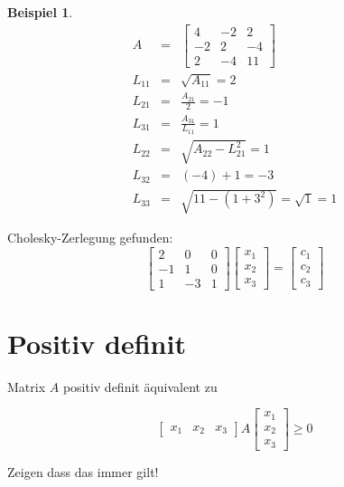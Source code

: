 \documentclass[11pt]{article} %
\theoremstyle{definition}
\newtheorem*{beispiel}{Beispiel}
\begin{document}
\begin{beispiel}
\begin{eqnarray*}
A &=& \begin{bmatrix}
4 & -2 & 2 \\ -2 & 2 & -4 \\ 2 & -4 & 11
\end{bmatrix} \\
L_{11} &=& \sqrt{A_{11}} = 2 \\
L_{21} &=& \frac{A_{21}}{2} = -1 \\
L_{31} &=& \frac{A_{31}}{L_{11}} = 1 \\
L_{22} &=& \sqrt{A_{22} - L_{21}^2} = 1 \\
L_{32} &=& (-4) + 1 = -3 \\
L_{33} &=& \sqrt{11 - (1+3^2)} = \sqrt{1} = 1
\end{eqnarray*}

Cholesky-Zerlegung gefunden:
\[
\begin{bmatrix}
2 & 0 & 0 \\
-1 & 1 & 0 \\
1 & -3 & 1
\end{bmatrix}
\begin{bmatrix}
x_1 \\ x_2 \\ x_3
\end{bmatrix} = \begin{bmatrix}
c_1 \\ c_2 \\ c_3
\end{bmatrix}
\] 

\end{beispiel}

\section{Positiv definit}

Matrix $A$ positiv definit äquivalent zu

\[
\begin{bmatrix} x_1 & x_2 & x_3 \end{bmatrix} A \begin{bmatrix} x_1 \\ x_2 \\ x_3 \end{bmatrix} \ge 0
\]

Zeigen dass das immer gilt!
\end{document}
